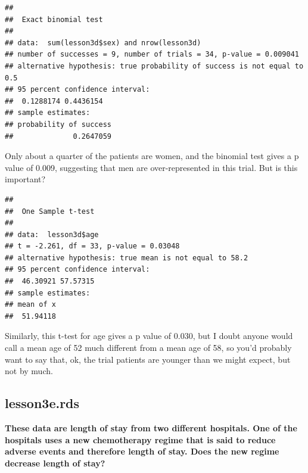 \documentclass[]{book}
\newenvironment{Shaded}{\begin{snugshade}}{\end{snugshade}}
\newcommand{\DataTypeTok}[1]{\textcolor[rgb]{0.13,0.29,0.53}{#1}}
\newcommand{\FloatTok}[1]{\textcolor[rgb]{0.00,0.00,0.81}{#1}}
\newcommand{\KeywordTok}[1]{\textcolor[rgb]{0.13,0.29,0.53}{\textbf{#1}}}
\newcommand{\NormalTok}[1]{#1}
\newcommand{\OperatorTok}[1]{\textcolor[rgb]{0.81,0.36,0.00}{\textbf{#1}}}
\begin{document}
\begin{Shaded}
\end{Shaded}

\begin{verbatim}
## 
##  Exact binomial test
## 
## data:  sum(lesson3d$sex) and nrow(lesson3d)
## number of successes = 9, number of trials = 34, p-value = 0.009041
## alternative hypothesis: true probability of success is not equal to 0.5
## 95 percent confidence interval:
##  0.1288174 0.4436154
## sample estimates:
## probability of success 
##              0.2647059
\end{verbatim}

Only about a quarter of the patients are women, and the binomial test
gives a p value of 0.009, suggesting that men are over-represented in
this trial. But is this important?

\begin{Shaded}
\end{Shaded}

\begin{verbatim}
## 
##  One Sample t-test
## 
## data:  lesson3d$age
## t = -2.261, df = 33, p-value = 0.03048
## alternative hypothesis: true mean is not equal to 58.2
## 95 percent confidence interval:
##  46.30921 57.57315
## sample estimates:
## mean of x 
##  51.94118
\end{verbatim}

Similarly, this t-test for age gives a p value of 0.030, but I doubt
anyone would call a mean age of 52 much different from a mean age of 58,
so you'd probably want to say that, ok, the trial patients are younger
than we might expect, but not by much.

\hypertarget{lesson3e.rds}{%
\subsection{lesson3e.rds}\label{lesson3e.rds}}

\textbf{These data are length of stay from two different hospitals. One
of the hospitals uses a new chemotherapy regime that is said to reduce
adverse events and therefore length of stay. Does the new regime
decrease length of stay?}
\end{document}
